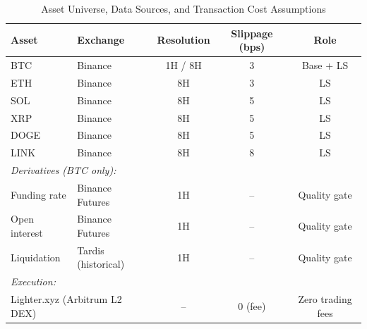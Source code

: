 \begin{table}[htbp]
\centering
\caption{Asset Universe, Data Sources, and Transaction Cost Assumptions}
\label{tab:assets}
\begin{tabular}{llccc}
\toprule
Asset & Exchange & Resolution & Slippage (bps) & Role \\
\midrule
BTC  & Binance & 1H / 8H & 3 & Base + LS \\
ETH  & Binance & 8H      & 3 & LS \\
SOL  & Binance & 8H      & 5 & LS \\
XRP  & Binance & 8H      & 5 & LS \\
DOGE & Binance & 8H      & 5 & LS \\
LINK & Binance & 8H      & 8 & LS \\
\midrule
\multicolumn{5}{l}{\textit{Derivatives (BTC only):}} \\
Funding rate    & Binance Futures & 1H & -- & Quality gate \\
Open interest   & Binance Futures & 1H & -- & Quality gate \\
Liquidation     & Tardis (historical) & 1H & -- & Quality gate \\
\midrule
\multicolumn{5}{l}{\textit{Execution:}} \\
\multicolumn{2}{l}{Lighter.xyz (Arbitrum L2 DEX)} & -- & 0 (fee) & Zero trading fees \\
\bottomrule
\end{tabular}
\end{table}

